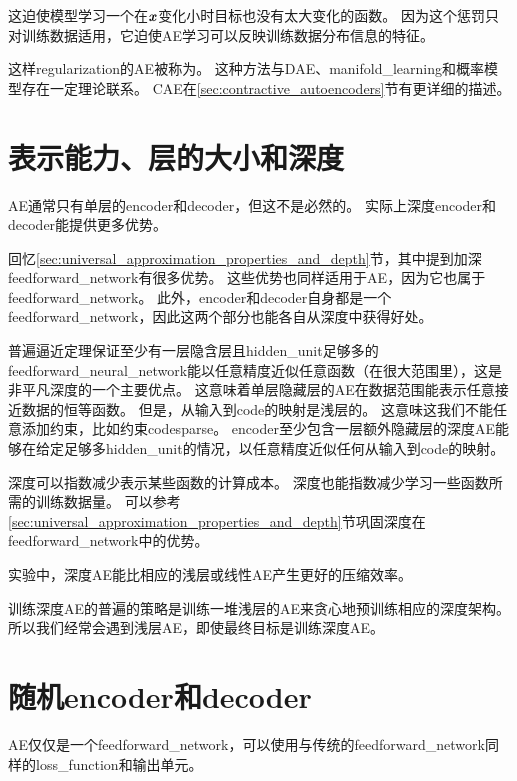 这迫使模型学习一个在$\boldsymbol{\mathit{x}}$变化小时目标也没有太大变化的函数。
因为这个惩罚只对训练数据适用，它迫使\gls{AE}学习可以反映训练数据分布信息的特征。


这样\gls{regularization}的\gls{AE}被称为。
这种方法与\gls{DAE}、\gls{manifold_learning}和概率模型存在一定理论联系。
\gls{CAE}在\ref{sec:contractive_autoencoders}节有更详细的描述。


\section{表示能力、层的大小和深度}
\label{sec:representational_power_layer_size_and_depth}
\gls{AE}通常只有单层的\gls{encoder}和\gls{decoder}，但这不是必然的。
实际上深度\gls{encoder}和\gls{decoder}能提供更多优势。


回忆\ref{sec:universal_approximation_properties_and_depth}节，其中提到加深\gls{feedforward_network}有很多优势。
这些优势也同样适用于\gls{AE}，因为它也属于\gls{feedforward_network}。
此外，\gls{encoder}和\gls{decoder}自身都是一个\gls{feedforward_network}，因此这两个部分也能各自从深度中获得好处。


普遍逼近定理保证至少有一层隐含层且\gls{hidden_unit}足够多的\gls{feedforward_neural_network}能以任意精度近似任意函数（在很大范围里），这是非平凡深度的一个主要优点。
这意味着单层隐藏层的\gls{AE}在数据范围能表示任意接近数据的恒等函数。
但是，从输入到\gls{code}的映射是浅层的。
这意味这我们不能任意添加约束，比如约束\gls{code}\gls{sparse}。
\gls{encoder}至少包含一层额外隐藏层的深度\gls{AE}能够在给定足够多\gls{hidden_unit}的情况，以任意精度近似任何从输入到\gls{code}的映射。


深度可以指数减少表示某些函数的计算成本。
深度也能指数减少学习一些函数所需的训练数据量。
可以参考\ref{sec:universal_approximation_properties_and_depth}节巩固深度在\gls{feedforward_network}中的优势。


实验中，深度\gls{AE}能比相应的浅层或线性\gls{AE}产生更好的压缩效率\citep{Hinton-Science2006}。

训练深度\gls{AE}的普遍的策略是训练一堆浅层的\gls{AE}来贪心地预训练相应的深度架构。
所以我们经常会遇到浅层\gls{AE}，即使最终目标是训练深度\gls{AE}。


\section{随机\gls{encoder}和\gls{decoder}}
\label{sec:stochastic_encoders_and_decoders}
\gls{AE}仅仅是一个\gls{feedforward_network}，可以使用与传统的\gls{feedforward_network}同样的\gls{loss_function}和输出单元。


